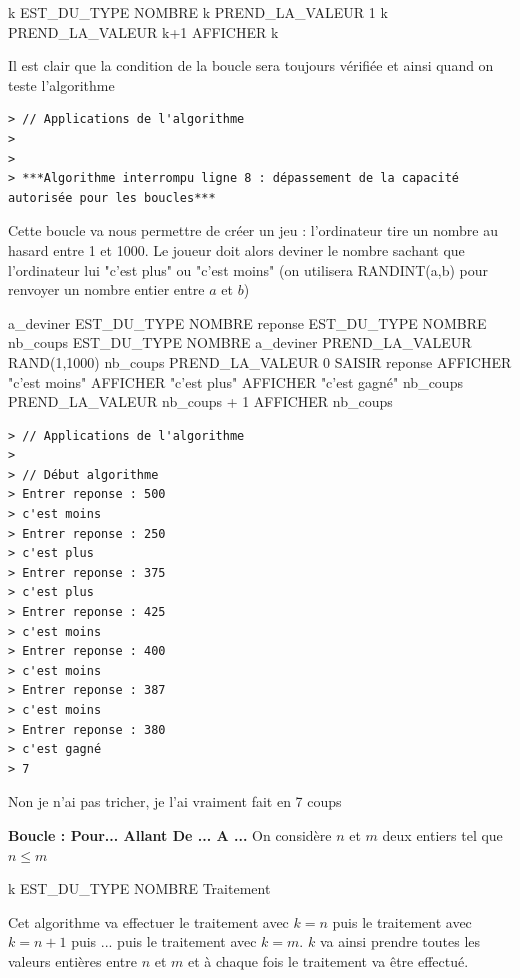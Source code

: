 \begin{algobox}
\Variables
\Ligne k EST\_DU\_TYPE NOMBRE
\DebutAlgo
\Ligne k PREND\_LA\_VALEUR 1
\DebutTantQue
\Ligne k PREND\_LA\_VALEUR k+1
\FinTantQue
\Ligne AFFICHER k
\FinAlgo
\end{algobox}
Il est clair que la condition de la boucle sera toujours vérifiée et ainsi quand on teste l'algorithme 
\begin{verbatim}
> // Applications de l'algorithme
>
>
> ***Algorithme interrompu ligne 8 : dépassement de la capacité autorisée pour les boucles***
\end{verbatim}
Cette boucle va nous permettre de créer un jeu : l'ordinateur tire un nombre au hasard entre 1 et 1000. Le joueur doit alors deviner le nombre sachant que l'ordinateur lui "c'est plus" ou "c'est moins" (on utilisera RANDINT(a,b) pour renvoyer un nombre entier entre $a$ et $b$)
\begin{algobox}
\Variables
\Ligne a\_deviner EST\_DU\_TYPE NOMBRE
\Ligne reponse EST\_DU\_TYPE NOMBRE
\Ligne nb\_coups EST\_DU\_TYPE NOMBRE
\DebutAlgo
\Ligne a\_deviner PREND\_LA\_VALEUR RAND(1,1000)
\Ligne nb\_coups PREND\_LA\_VALEUR 0
\DebutTantQue
\Ligne SAISIR reponse
\DebutSi
\Ligne AFFICHER "c'est moins"
\FinSi
\Sinon
\DebutSinon
{}
\DebutSi
\Ligne AFFICHER "c'est plus"
\FinSi
\Sinon
\DebutSinon
\Ligne AFFICHER "c'est gagné"
\FinSinon
\FinSinon
\Ligne nb\_coups PREND\_LA\_VALEUR nb\_coups + 1
\FinTantQue
\Ligne AFFICHER nb\_coups
\FinAlgo

\end{algobox}
\begin{verbatim}
> // Applications de l'algorithme
>
> // Début algorithme
> Entrer reponse : 500
> c'est moins
> Entrer reponse : 250
> c'est plus
> Entrer reponse : 375
> c'est plus
> Entrer reponse : 425
> c'est moins
> Entrer reponse : 400
> c'est moins
> Entrer reponse : 387
> c'est moins
> Entrer reponse : 380
> c'est gagné
> 7
\end{verbatim}
Non je n'ai pas tricher, je l'ai vraiment fait en 7 coups\newline

\textbf{Boucle : Pour... Allant De ... A ...}
On considère $n$ et $m$ deux entiers tel que $n \leq m$
\begin{algobox}
\Variables
\Ligne k EST\_DU\_TYPE NOMBRE
\DebutAlgo
{}
\DebutPour
\Ligne Traitement
\FinPour
\FinAlgo
\end{algobox}
Cet algorithme va effectuer le traitement avec $k=n$ puis le traitement avec $k=n+1$ puis ... puis le traitement avec $k=m$. $k$ va ainsi prendre toutes les valeurs entières entre $n$ et $m$ et à chaque fois le traitement va être effectué. 

